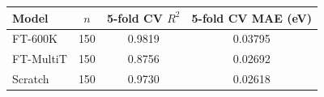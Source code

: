 \begin{tabular}{lccc}
\toprule
Model & $n$ & 5-fold CV $R^2$ & 5-fold CV MAE (eV) \\
\midrule
FT-600K & 150 & 0.9819 & 0.03795 \\
FT-MultiT & 150 & 0.8756 & 0.02692 \\
Scratch & 150 & 0.9730 & 0.02618 \\
\bottomrule
\end{tabular}
